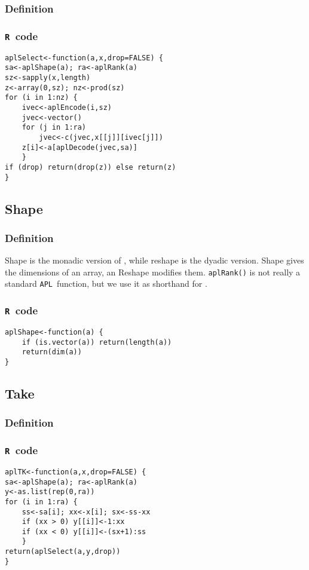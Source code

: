 \documentclass[11pt]{amsart}
\theoremstyle{plain}
\theoremstyle{definition}
\theoremstyle{remark}
\newcommand{\tR}{\texttt{R}}
\newcommand{\tA}{\texttt{APL}}
\newcommand{\tRc}[1]{\lstinline{#1}}
\newcommand{\tAc}[1]{{\apl{#1}}}
\begin{document}
\subsubsection{Definition}
\subsubsection{\tR\ code}\quad
\begin{lstlisting}
aplSelect<-function(a,x,drop=FALSE) {
sa<-aplShape(a); ra<-aplRank(a)
sz<-sapply(x,length)
z<-array(0,sz); nz<-prod(sz)
for (i in 1:nz) {
    ivec<-aplEncode(i,sz)
    jvec<-vector()
    for (j in 1:ra)
        jvec<-c(jvec,x[[j]][ivec[j]])
    z[i]<-a[aplDecode(jvec,sa)]
    }
if (drop) return(drop(z)) else return(z)
}
\end{lstlisting}

\subsection{Shape}
\subsubsection{Definition}

Shape is the monadic version of \tAc{\qrho}, while reshape is the dyadic version. Shape gives the dimensions of an array, an Reshape modifies them. \tRc{aplRank()} is not really a standard \tA\ function, but we use it
as shorthand for \tAc{\qrho\qrho A}.

\subsubsection{\tR\ code}\quad
\begin{lstlisting}
aplShape<-function(a) {
    if (is.vector(a)) return(length(a))
    return(dim(a))
}
\end{lstlisting}


\subsection{Take}\quad
\subsubsection{Definition}
\subsubsection{\tR\ code}\quad

\begin{lstlisting}
aplTK<-function(a,x,drop=FALSE) {
sa<-aplShape(a); ra<-aplRank(a)
y<-as.list(rep(0,ra))
for (i in 1:ra) {
    ss<-sa[i]; xx<-x[i]; sx<-ss-xx
    if (xx > 0) y[[i]]<-1:xx
    if (xx < 0) y[[i]]<-(sx+1):ss
    }
return(aplSelect(a,y,drop))
}
\end{lstlisting}
\end{document}
